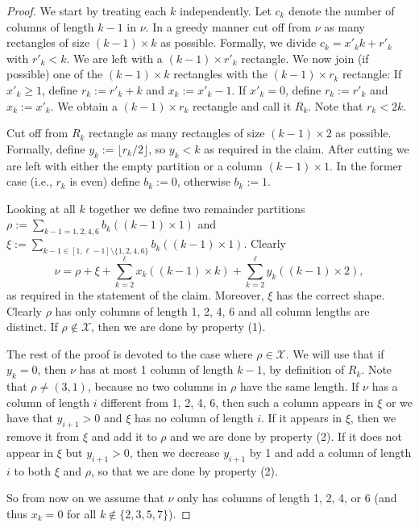 \documentclass{article}
\numberwithin{equation}{section}
\theoremstyle{definition}
\newcommand{\exceptions}{{\mathscr{X}}}
\begin{document}
\begin{proof}
We start by treating each $k$ independently.
Let $c_k$ denote the number of columns of length $k-1$ in $\nu$.
In a greedy manner cut off from $\nu$ as many rectangles of size $(k-1)\times k$ as possible.
Formally, we divide
$c_k = x'_k k + r'_k$ with $r'_k<k$.
We are left with a $(k-1) \times r'_k$ rectangle.
We now join (if possible) one of the $(k-1)\times k$ rectangles with the $(k-1) \times r_k$ rectangle:
If $x'_k\geq 1$, define $r_k := r'_k+k$ and $x_k:=x'_k-1$.
If $x'_k=0$, define $r_k := r'_k$ and $x_k:=x'_k$.
We obtain a $(k-1) \times r_k$ rectangle and call it $R_k$.
Note that $r_k < 2k$.

Cut off from $R_k$ rectangle as many rectangles of size $(k-1)\times 2$ as possible.
Formally, define $y_k := \lfloor r_k / 2 \rfloor$, so $y_k < k$ as required in the claim.
After cutting we are left with either the empty partition or a column $(k-1)\times 1$.
In the former case (i.e., $r_k$ is even) define $b_k:=0$, otherwise $b_k:=1$.

Looking at all $k$ together we define two remainder partitions
$
\rho := \sum_{k-1=1,2,4,6} b_k ((k-1)\times 1)
$
and
$
\xi := \sum_{k-1 \in [1,\ell-1]\setminus\{1,2,4,6\}} b_k ((k-1)\times 1).
$
Clearly
\[\textstyle
\nu = \rho + \xi + \sum_{k=2}^\ell x_k ((k-1) \times k) + \sum_{k=2}^\ell y_k ((k-1) \times 2),
\]
as required in the statement of the claim.
Moreover, $\xi$ has the correct shape.
Clearly $\rho$ has only columns of length 1, 2, 4, 6 and all column lengths are distinct.
If $\rho \notin \exceptions$, then we are done by property (1).

The rest of the proof is devoted to the case where $\rho \in \exceptions$.
We will use that if $y_k=0$, then $\nu$ has at most 1 column of length $k-1$, by definition of $R_k$.
Note that $\rho \neq (3,1)$, because no two columns in $\rho$ have the same length.
If $\nu$ has a column of length $i$ different from 1, 2, 4, 6, then
such a column appears in $\xi$ or we have that $y_{i+1} > 0$ and $\xi$ has no column of length $i$.
If it appears in $\xi$, then we remove it from $\xi$ and add it to $\rho$ and we are done by property (2).
If it does not appear in $\xi$ but $y_{i+1}>0$, then we decrease $y_{i+1}$ by 1 and add a column of length $i$ to both $\xi$ and $\rho$,
so that we are done by property (2).

So from now on we assume that $\nu$ only has columns of length 1, 2, 4, or 6 (and thus $x_k=0$ for all $k \notin \{2,3,5,7\}$).


\end{proof}
\end{document}
